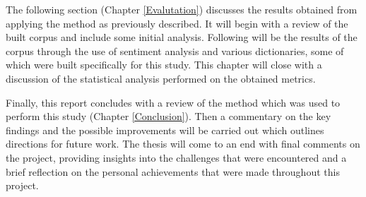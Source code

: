 The following section (Chapter \ref{Evalutation}) discusses the results obtained from applying the method as previously described. It will begin with a review of the built corpus and include some initial analysis. Following will be the results of the corpus through the use of sentiment analysis and various dictionaries, some of which were built specifically for this study. This chapter will close with a discussion of the statistical analysis performed on the obtained metrics.

Finally, this report concludes with a review of the method which was used to perform this study (Chapter \ref{Conclusion}). Then a commentary on the key findings and the possible improvements will be carried out which outlines directions for future work. The thesis will come to an end with final comments on the project, providing insights into the challenges that were encountered and a brief reflection on the personal achievements that were made throughout this project.
